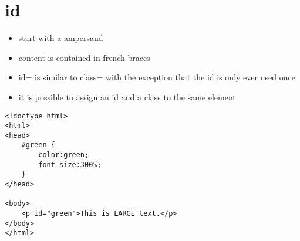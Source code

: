 \documentclass{article}
\begin{document}
\section{id}
\begin{itemize}
  \item start with a ampersand
  \item content is contained in french braces
  \item id= is similar to class= with the exception that the id is only ever
    used once
  \item it is possible to assign an id and a class to the same element
\end{itemize}
\begin{lstlisting}
<!doctype html>
<html>
<head>
    #green {
        color:green;
        font-size:300%;
    }
</head>

<body>
    <p id="green">This is LARGE text.</p>
</body>
</html>
\end{lstlisting}
\end{document}
